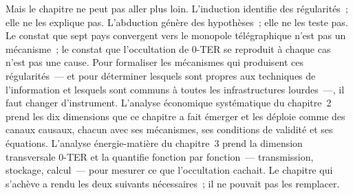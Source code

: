 Mais le chapitre ne peut pas aller plus loin. L'induction identifie des régularités~; elle ne les explique pas. L'abduction génère des hypothèses~; elle ne les teste pas. Le constat que sept pays convergent vers le monopole télégraphique n'est pas un mécanisme~; le constat que l'occultation de 0-TER se reproduit à chaque cas n'est pas une cause. Pour formaliser les mécanismes qui produisent ces régularités~--- et pour déterminer lesquels sont propres aux techniques de l'information et lesquels sont communs à toutes les infrastructures lourdes~---, il faut changer d'instrument. L'analyse économique systématique du chapitre~2 prend les dix dimensions que ce chapitre a fait émerger et les déploie comme des canaux causaux, chacun avec ses mécanismes, ses conditions de validité et ses équations. L'analyse énergie-matière du chapitre~3 prend la dimension transversale 0-TER et la quantifie fonction par fonction~--- transmission, stockage, calcul~--- pour mesurer ce que l'occultation cachait. Le chapitre qui s'achève a rendu les deux suivants nécessaires~; il ne pouvait pas les remplacer.